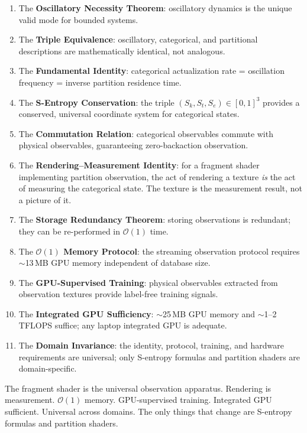 \documentclass[11pt,twocolumn,a4paper]{article}
\newcommand{\Sk}{S_k}
\newcommand{\St}{S_t}
\newcommand{\Se}{S_e}
\newcommand{\BigO}{\mathcal{O}}
\begin{document}
\begin{enumerate}[leftmargin=*,itemsep=2pt]
\item The \textbf{Oscillatory Necessity Theorem}: oscillatory
  dynamics is the unique valid mode for bounded systems.
\item The \textbf{Triple Equivalence}: oscillatory, categorical,
  and partitional descriptions are mathematically identical, not
  analogous.
\item The \textbf{Fundamental Identity}: categorical actualization
  rate = oscillation frequency = inverse partition residence time.
\item The \textbf{S-Entropy Conservation}: the triple
  $(\Sk, \St, \Se) \in [0,1]^3$ provides a conserved, universal
  coordinate system for categorical states.
\item The \textbf{Commutation Relation}: categorical observables
  commute with physical observables, guaranteeing zero-backaction
  observation.
\item The \textbf{Rendering--Measurement Identity}: for a fragment
  shader implementing partition observation, the act of rendering
  a texture \emph{is} the act of measuring the categorical state.
  The texture is the measurement result, not a picture of it.
\item The \textbf{Storage Redundancy Theorem}: storing observations
  is redundant; they can be re-performed in $\BigO(1)$ time.
\item The \textbf{$\BigO(1)$ Memory Protocol}: the streaming
  observation protocol requires $\sim$13\,MB GPU memory independent
  of database size.
\item The \textbf{GPU-Supervised Training}: physical observables
  extracted from observation textures provide label-free training
  signals.
\item The \textbf{Integrated GPU Sufficiency}: $\sim$25\,MB
  GPU memory and $\sim$1--2\,TFLOPS suffice; any laptop integrated
  GPU is adequate.
\item The \textbf{Domain Invariance}: the identity, protocol,
  training, and hardware requirements are universal; only S-entropy
  formulas and partition shaders are domain-specific.
\end{enumerate}

The fragment shader is the universal observation apparatus.
Rendering is measurement. $\BigO(1)$ memory. GPU-supervised training.
Integrated GPU sufficient. Universal across domains. The only things
that change are S-entropy formulas and partition shaders.
\end{document}
